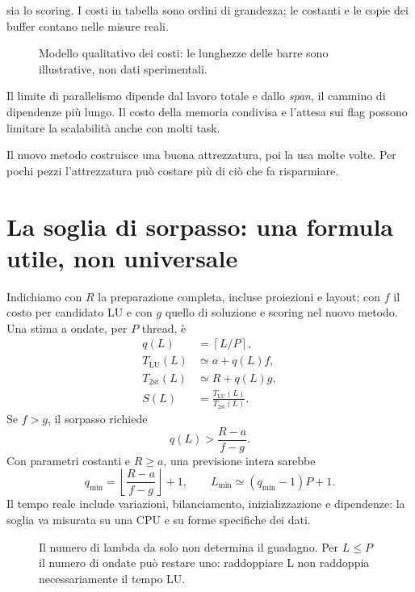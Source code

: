\documentclass[11pt,a4paper]{article}
\newcommand{\semplice}[1]{\begin{idea}[title=In parole semplici]#1\end{idea}}
\newcommand{\page}[1]{\clearpage\section{#1}}
\begin{document}
sia lo scoring. I costi in tabella sono ordini di grandezza; le costanti e le
copie dei buffer contano nelle misure reali.
\begin{figure}[H]\centering
{}
\caption{Modello qualitativo dei costi: le lunghezze delle barre sono illustrative, non dati sperimentali.}
\end{figure}
Il limite di parallelismo dipende dal lavoro totale e dallo \emph{span},
il cammino di dipendenze più lungo. Il costo della memoria condivisa e
l'attesa sui flag possono limitare la scalabilità anche con molti task.
\semplice{Il nuovo metodo costruisce una buona attrezzatura, poi la usa
molte volte. Per pochi pezzi l'attrezzatura può costare più di ciò che fa risparmiare.}
\page{La soglia di sorpasso: una formula utile, non universale}
Indichiamo con $R$ la preparazione completa, incluse proiezioni e layout;
con $f$ il costo per candidato LU e con $g$ quello di soluzione e scoring
nel nuovo metodo. Una stima a ondate, per $P$ thread, è
\begin{align}
q(L)&=\left\lceil L/P\right\rceil,\\
T_{\mathrm{LU}}(L)&\simeq a+q(L)f,\\
T_{\mathrm{2st}}(L)&\simeq R+q(L)g,\\
S(L)&=\frac{T_{\mathrm{LU}}(L)}{T_{\mathrm{2st}}(L)}.
\end{align}
Se $f>g$, il sorpasso richiede
\[
\boxed{q(L)>\frac{R-a}{f-g}}.
\]
Con parametri costanti e $R\ge a$, una previsione intera sarebbe
\[
q_{\min}=\left\lfloor\frac{R-a}{f-g}\right\rfloor+1,
\qquad L_{\min}\simeq(q_{\min}-1)P+1.
\]
Il tempo reale include variazioni, bilanciamento, inizializzazione e
dipendenze: la soglia va misurata su una CPU e su forme specifiche dei dati.
\begin{figure}[H]\centering
{}
\caption{Il numero di lambda da solo non determina il guadagno. Per $L\le P$ il numero di ondate può restare uno: raddoppiare L non raddoppia necessariamente il tempo LU.}
\end{figure}
\end{document}
